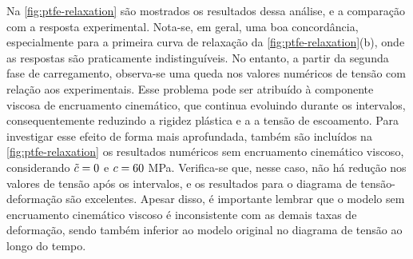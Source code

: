 \documentclass[Tese.tex]{subfiles}
\begin{document}
{Na \autoref{fig:ptfe-relaxation} são mostrados os resultados dessa análise, e a comparação com a resposta experimental. Nota-se, em geral, uma boa concordância, especialmente para a primeira curva de relaxação da \autoref{fig:ptfe-relaxation}(b), onde as respostas são praticamente indistinguíveis. No entanto, a partir da segunda fase de carregamento, observa-se uma queda nos valores numéricos de tensão com relação aos experimentais. Esse problema pode ser atribuído à componente viscosa de encruamento cinemático, que continua evoluindo durante os intervalos, consequentemente reduzindo a rigidez plástica e a a tensão de escoamento. Para investigar esse efeito de forma mais aprofundada, também são incluídos na \autoref{fig:ptfe-relaxation} os resultados numéricos sem encruamento cinemático viscoso, considerando $\tilde{c}=0$ e $c = 60$ MPa. Verifica-se que, nesse caso, não há redução nos valores de tensão após os intervalos, e os resultados para o diagrama de tensão-deformação são excelentes. Apesar disso, é importante lembrar que o modelo sem encruamento cinemático viscoso é inconsistente com as demais taxas de deformação, sendo também inferior ao modelo original no diagrama de tensão ao longo do tempo.

}
\end{document}
